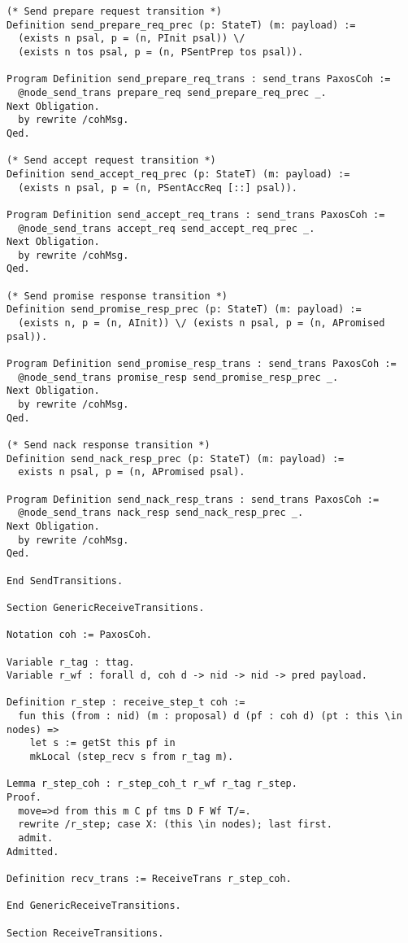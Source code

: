 \begin{landscape}
\begin{multicols*}{2}
\begin{lstlisting}[style=SourceCodeListing]
(* Send prepare request transition *)
Definition send_prepare_req_prec (p: StateT) (m: payload) :=
  (exists n psal, p = (n, PInit psal)) \/
  (exists n tos psal, p = (n, PSentPrep tos psal)).

Program Definition send_prepare_req_trans : send_trans PaxosCoh :=
  @node_send_trans prepare_req send_prepare_req_prec _.
Next Obligation.
  by rewrite /cohMsg.
Qed.

(* Send accept request transition *)
Definition send_accept_req_prec (p: StateT) (m: payload) :=
  (exists n psal, p = (n, PSentAccReq [::] psal)).

Program Definition send_accept_req_trans : send_trans PaxosCoh :=
  @node_send_trans accept_req send_accept_req_prec _.
Next Obligation.
  by rewrite /cohMsg.
Qed.

(* Send promise response transition *)
Definition send_promise_resp_prec (p: StateT) (m: payload) :=
  (exists n, p = (n, AInit)) \/ (exists n psal, p = (n, APromised psal)).

Program Definition send_promise_resp_trans : send_trans PaxosCoh :=
  @node_send_trans promise_resp send_promise_resp_prec _.
Next Obligation.
  by rewrite /cohMsg.
Qed.

(* Send nack response transition *)
Definition send_nack_resp_prec (p: StateT) (m: payload) :=
  exists n psal, p = (n, APromised psal).

Program Definition send_nack_resp_trans : send_trans PaxosCoh :=
  @node_send_trans nack_resp send_nack_resp_prec _.
Next Obligation.
  by rewrite /cohMsg.
Qed.

End SendTransitions.

Section GenericReceiveTransitions.

Notation coh := PaxosCoh.

Variable r_tag : ttag.
Variable r_wf : forall d, coh d -> nid -> nid -> pred payload.

Definition r_step : receive_step_t coh :=
  fun this (from : nid) (m : proposal) d (pf : coh d) (pt : this \in nodes) =>
    let s := getSt this pf in
    mkLocal (step_recv s from r_tag m).

Lemma r_step_coh : r_step_coh_t r_wf r_tag r_step.
Proof.
  move=>d from this m C pf tms D F Wf T/=.
  rewrite /r_step; case X: (this \in nodes); last first.
  admit.
Admitted.

Definition recv_trans := ReceiveTrans r_step_coh.

End GenericReceiveTransitions.

Section ReceiveTransitions.


\end{lstlisting}
\end{multicols*}
\end{landscape}
